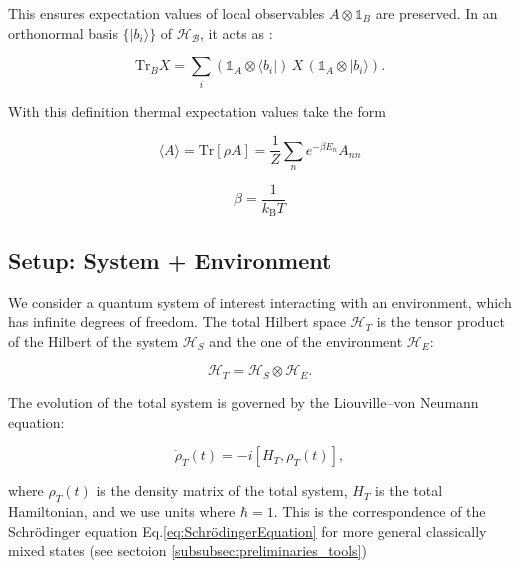 \noindent
This ensures expectation values of local observables $A \otimes \mathds{1}_B$ are preserved. In an orthonormal basis $\{|b_i\rangle\}$ of $\mathcal{H_B}$, it acts as \cite{steebhardy2018problemssolutionsquantum}:

\begin{equation} \label{eq:ho_partial_trace_definition}
	\mathrm{Tr}_B X = \sum_i (\mathds{1}_A \otimes \langle b_i|) \, X \, (\mathds{1}_A \otimes |b_i\rangle).
\end{equation}

\noindent
With this definition thermal expectation values take the form

\begin{equation} \label{eq:ho_expectation_value} \langle A \rangle = \mathrm{Tr}[\rho A] = \frac{1}{Z} \sum_n e^{-\beta E_n} A_{nn}
\end{equation}

\begin{equation} \label{eq:ho_beta_definition}
	\beta = \frac{1}{k_{\mathrm{B}} T}
\end{equation}


\subsection{Setup: System + Environment}

\noindent
We consider a quantum system of interest interacting with an environment, which has infinite degrees of freedom. The total Hilbert space $\mathcal{H}_T$ is the tensor product of the Hilbert of the system $\mathcal{H}_S$ and the one of the environment $\mathcal{H}_E$:

\begin{equation}
	\mathcal{H}_T = \mathcal{H}_S \otimes \mathcal{H}_E.
	\label{eq:Total_Hilbert_Space}
\end{equation}

\noindent
The evolution of the total system is governed by the Liouville–von Neumann equation:

\begin{equation}
	\dot{\rho}_T(t) = -i[H_T, \rho_T(t)],
	\label{eq:Von_Neumann_Equation}
\end{equation}

\noindent
where $\rho_T(t)$ is the density matrix of the total system, $H_T$ is the total Hamiltonian, and we use units where $\hbar = 1$. This is the correspondence of the Schrödinger equation Eq.\eqref{eq:SchrödingerEquation} for more general classically mixed states (see sectoion \ref{subsubsec:preliminaries_tools})

